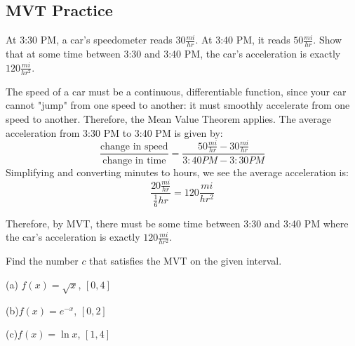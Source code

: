\subsection{MVT Practice}
\begin{Exercise}
[label=MVT1]
At 3:30 PM, a car's speedometer reads $30 \frac{mi}{hr}$. At 3:40 PM, it reads 
$50\frac{mi}{hr}$. Show that at some time between 3:30 and 3:40 PM, the car's 
acceleration is exactly $120 \frac{mi}{hr^2}$. 
\end{Exercise}
\begin{Answer}
[ref=MVT1]
The speed of a car must be a continuous, differentiable function, since your car 
cannot "jump" from one speed to another: it must smoothly accelerate from one 
speed to another. Therefore, the Mean Value Theorem applies. The average 
acceleration from 3:30 PM to 3:40 PM is given by:
$$\frac{\text{change in speed}}{\text{change in time}} = \frac{50 \frac{mi}{hr}
 - 30\frac{mi}{hr}}{3:40PM - 3:30PM}$$ 
Simplifying and converting minutes to hours, we see the average acceleration is:
$$\frac{20\frac{mi}{hr}}{\frac{1}{6}hr} = 120\frac{mi}{hr^2}$$

Therefore, by MVT, there must be some time between 3:30 and 3:40 PM where the 
car's acceleration is exactly $120 \frac{mi}{hr^2}$. 
\end{Answer}

\begin{Exercise}
[label=MVT2]
Find the number $c$ that satisfies the MVT on the given interval. 

(a) $f(x) = \sqrt{x}$, $[0, 4]$

(b)$f(x) = e^{-x}$, $[0,2]$

(c)$f(x) = \ln{x}$, $[1,4]$	
\end{Exercise}

